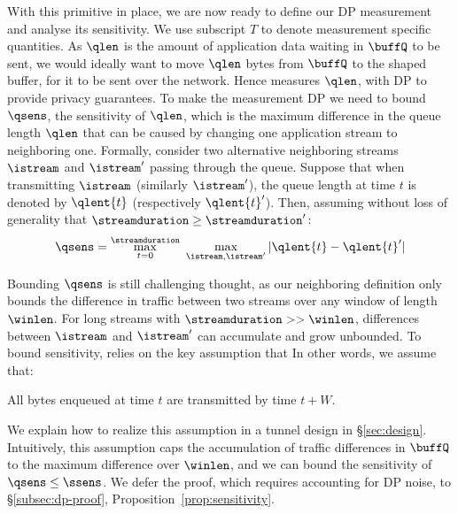 With this primitive in place, we are now ready to define our DP measurement and
analyse its sensitivity. We use subscript $T$ to denote measurement specific
quantities.
As $\qlen$ is the amount of application data waiting in $\buffQ$ to be sent, we
would ideally want {\sys} to move $\qlen$ bytes from $\buffQ$ to the shaped
buffer, for it to be sent over the network.  Hence {\sys} measures $\qlen$, with
DP to provide privacy guarantees. To make the measurement DP we need to bound
$\qsens$, the sensitivity of $\qlen$, which is the maximum difference in the
queue length $\qlen$ that can be caused  by changing one application stream to
neighboring one.
Formally, consider two alternative neighboring streams $\istream$ and
$\istream'$ passing through the queue.
Suppose that when transmitting $\istream$ (similarly $\istream'$), the
queue length at time $t$ is denoted by $\qlent{t}$ (respectively $\qlent{t}'$).
Then, assuming without loss of generality that $\streamduration \geq
\streamduration'$:
\setlength{\abovedisplayskip}{0pt}
\begin{equation}
    \qsens = \max_{t = 0}^{\streamduration}~\max_{\istream,
        \istream'} | \qlent{t} - \qlent{t}' |
    \label{eqn:ssens}
\end{equation}

Bounding $\qsens$ is still challenging thought, as our neighboring definition
only bounds the difference in traffic between two streams over any window of
length $\winlen$.
For long streams with $\streamduration >> \winlen$, differences between
$\istream$ and $\istream'$ can accumulate and grow unbounded.
To bound sensitivity, {\sys} relies on the key assumption that
In other words, we assume that:
\begin{assumption}\label{assumption:window}
  All bytes enqueued  at time $t$ are transmitted by time
  $t+W$.
\end{assumption}
We explain how to realize this assumption in a tunnel design in
\S\ref{sec:design}.
%
Intuitively, this assumption caps the accumulation of traffic differences in
$\buffQ$ to the maximum difference over $\winlen$, and we can bound the
sensitivity of $\qsens \leq \ssens$. We defer the proof, which requires
accounting for DP noise, to \S\ref{subsec:dp-proof},
Proposition~\ref{prop:sensitivity}.

